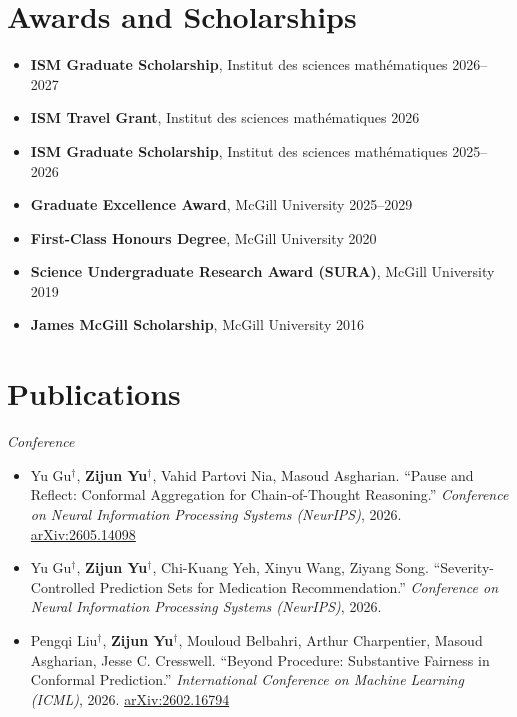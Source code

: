 \documentclass[11pt,letterpaper]{article}
\newcommand{\subhead}[1]{\vspace{0.15cm}\noindent\textit{#1}\vspace{0.1cm}}
\begin{document}
\vspace{0.2cm}


\section*{Awards and Scholarships}

\begin{itemize}[leftmargin=0.5cm]
	\item \textbf{ISM Graduate Scholarship}, Institut des sciences math\'ematiques \hfill 2026--2027
	\item \textbf{ISM Travel Grant}, Institut des sciences math\'ematiques \hfill 2026
	\item \textbf{ISM Graduate Scholarship}, Institut des sciences math\'ematiques \hfill 2025--2026
	\item \textbf{Graduate Excellence Award}, McGill University \hfill 2025--2029
	\item \textbf{First-Class Honours Degree}, McGill University \hfill 2020
	\item \textbf{Science Undergraduate Research Award (SURA)}, McGill University \hfill 2019
	\item \textbf{James McGill Scholarship}, McGill University \hfill 2016
\end{itemize}

\vspace{0.2cm}


\section*{Publications}


\subhead{Conference}

\begin{itemize}[leftmargin=0.5cm]
	\item Yu Gu$^\dagger$, \textbf{Zijun Yu}$^\dagger$, Vahid Partovi Nia, Masoud Asgharian.
	      ``Pause and Reflect: Conformal Aggregation for Chain-of-Thought Reasoning.''
	      \textit{Conference on Neural Information Processing Systems (NeurIPS)}, 2026.
	      \href{https://arxiv.org/abs/2605.14098}{arXiv:2605.14098}

	\item Yu Gu$^\dagger$, \textbf{Zijun Yu}$^\dagger$, Chi-Kuang Yeh, Xinyu Wang, Ziyang Song.
	      ``Severity-Controlled Prediction Sets for Medication Recommendation.''
	      \textit{Conference on Neural Information Processing Systems (NeurIPS)}, 2026.

	\item Pengqi Liu$^\dagger$, \textbf{Zijun Yu}$^\dagger$, Mouloud Belbahri, Arthur Charpentier,
	      Masoud Asgharian, Jesse C. Cresswell.
	      ``Beyond Procedure: Substantive Fairness in Conformal Prediction.''
	      \textit{International Conference on Machine Learning (ICML)}, 2026.
	      \href{https://arxiv.org/abs/2602.16794}{arXiv:2602.16794}
\end{itemize}
\end{document}
